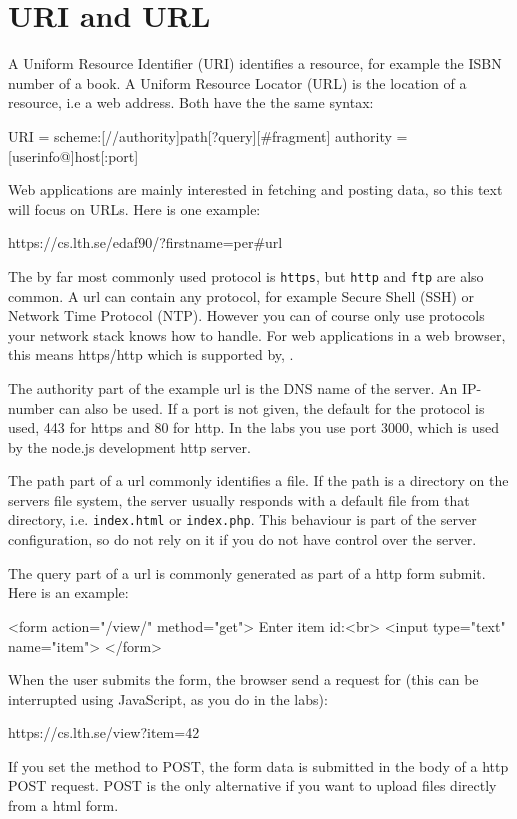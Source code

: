 \section{URI and URL} \label{section:url}
A Uniform Resource Identifier (URI) identifies a resource, for example the ISBN number of a book. A Uniform Resource Locator (URL) is the location of a resource, i.e a web address. Both have the the same syntax:
\begin{Code}
URI = scheme:[//authority]path[?query][#fragment]
authority = [userinfo@]host[:port]
\end{Code}
Web applications are mainly interested in fetching and posting data, so this text will focus on URLs. Here is one example:
\begin{Code}
https://cs.lth.se/edaf90/?firstname=per#url
\end{Code}
The by far most commonly used protocol is \texttt{https}, but \texttt{http} and \texttt{ftp} are also common.  A url can contain any protocol, for example Secure Shell (SSH) or Network Time Protocol (NTP). However you can of course only use protocols your network stack knows how to handle. For web applications in a web browser, this means https/http which is supported by, . 

The authority part of the example url is the DNS name of the server. An IP-number can also be used. If a port is not given, the default for the protocol is used, 443 for https and 80 for http. In the labs you use port 3000, which is used by the node.js development http server.

The path part of a url commonly identifies a file. If the path is a directory on the servers file system, the server usually responds with a default file from that directory, i.e. \texttt{index.html} or \texttt{index.php}. This behaviour is part of the server configuration, so do not rely on it if you do not have control over the server. 

The query part of a url is commonly generated as part of a http form submit. Here is an example:
\begin{Code}
<form action="/view/" method="get">
  Enter item id:<br>
  <input type="text" name="item">
</form>
\end{Code}
When the user submits the form, the browser send a request for (this can be interrupted using JavaScript, as you do in the labs):
\begin{Code}
https://cs.lth.se/view?item=42
\end{Code}
If you set the method to POST, the form data is submitted in the body of a http POST request. POST is the only alternative if you want to upload files directly from a html form.

